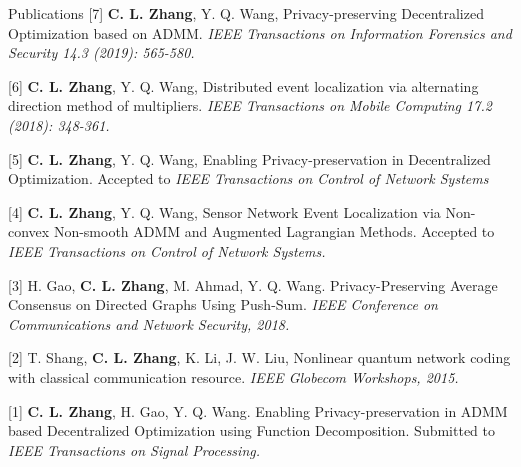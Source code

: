 \documentclass{resume} %
\begin{document}
\vspace{-0.2cm}
\begin{rSection}{Publications}	
	[7] \textbf{C. L. Zhang}, Y. Q. Wang, Privacy-preserving Decentralized Optimization based on ADMM. \emph{IEEE Transactions on Information Forensics and Security 14.3 (2019): 565-580.}

	\vspace{-0.2cm}	
	[6]	\textbf{C. L. Zhang}, Y. Q. Wang, Distributed event localization via alternating direction method of multipliers. \emph{IEEE Transactions on Mobile Computing 17.2 (2018): 348-361.}
	
	\vspace{-0.2cm}	
	[5] \textbf{C. L. Zhang}, Y. Q. Wang, Enabling Privacy-preservation in Decentralized Optimization.  Accepted to \emph{IEEE Transactions on Control of Network Systems}
	
	\vspace{-0.2cm}		
	[4] \textbf{C. L. Zhang}, Y. Q. Wang, Sensor Network Event Localization via Non-convex Non-smooth ADMM and Augmented Lagrangian Methods. Accepted to  \emph{IEEE Transactions on Control of Network Systems.}

	\vspace{-0.2cm}		
	[3] H. Gao, \textbf{C. L. Zhang}, M. Ahmad, Y. Q. Wang. Privacy-Preserving Average Consensus on Directed Graphs Using Push-Sum.  \emph{IEEE Conference on Communications and Network Security, 2018.}

	\vspace{-0.2cm}		
	[2] T. Shang, \textbf{C. L. Zhang}, K. Li, J. W. Liu, Nonlinear quantum network coding with classical
	communication resource.  \emph{IEEE Globecom Workshops, 2015.}

	\vspace{-0.2cm}		
	[1] \textbf{C. L. Zhang}, H. Gao,  Y. Q. Wang. Enabling Privacy-preservation in ADMM based Decentralized Optimization using Function Decomposition. Submitted to \emph{IEEE Transactions on Signal Processing.}
\end{rSection}
\end{document}
